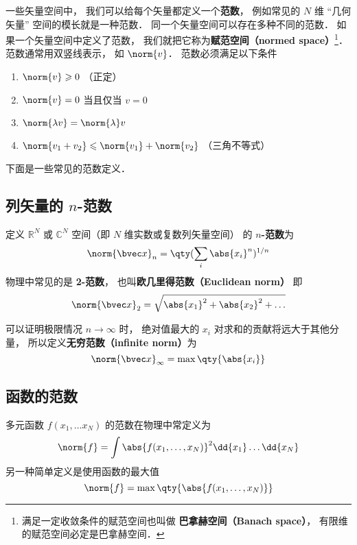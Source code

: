 

一些矢量空间中， 我们可以给每个矢量都定义一个\textbf{范数}， 例如常见的 $N$ 维 “几何矢量” 空间的模长就是一种范数． 同一个矢量空间可以存在多种不同的范数． 如果一个矢量空间中定义了范数， 我们就把它称为\textbf{赋范空间（normed space）}\footnote{满足一定收敛条件的赋范空间也叫做 \textbf{巴拿赫空间（Banach space）}， 有限维的赋范空间必定是巴拿赫空间．%
}． 范数通常用双竖线表示， 如 $\norm{v}$． 范数必须满足以下条件

\begin{enumerate}
\item $\norm{v} \geqslant 0$ （正定）
\item $\norm{v} = 0$ 当且仅当 $v = 0$
\item $\norm{\lambda v} = \norm{\lambda} v$
\item $\norm{v_1 + v_2} \leqslant \norm{v_1} + \norm{v_2}$ （三角不等式）

\end{enumerate}

下面是一些常见的范数定义．

\subsection{列矢量的 $n$-范数}
定义 $\mathbb R^N$ 或 $\mathbb C^N$ 空间（即 $N$ 维实数或复数列矢量空间） 的 \textbf{$n$-范数}为
\begin{equation}
\norm{\bvec x}_n = \qty(\sum_i \abs{x_i}^n)^{1/n}
\end{equation}
物理中常见的是 \textbf{2-范数}， 也叫\textbf{欧几里得范数（Euclidean norm）} 即
\begin{equation}
\norm{\bvec x}_2 = \sqrt{\abs{x_1}^2 + \abs{x_2}^2 + \dots}
\end{equation}

可以证明极限情况 $n \to \infty$ 时， 绝对值最大的 $x_i$ 对求和的贡献将远大于其他分量， 所以定义\textbf{无穷范数（infinite norm）}为
\begin{equation}
\norm{\bvec x}_\infty = \max \qty{\abs{x_i}}
\end{equation}

\subsection{函数的范数}
多元函数 $f(x_1, \dots x_N)$ 的范数在物理中常定义为
\begin{equation}
\norm{f} = \int \abs{f(x_1, \dots, x_N)}^2 \dd{x_1}\dots \dd{x_N}
\end{equation}
另一种简单定义是使用函数的最大值
\begin{equation}
\norm{f} = \max\qty{\abs{f(x_1, \dots, x_N)}}
\end{equation}
